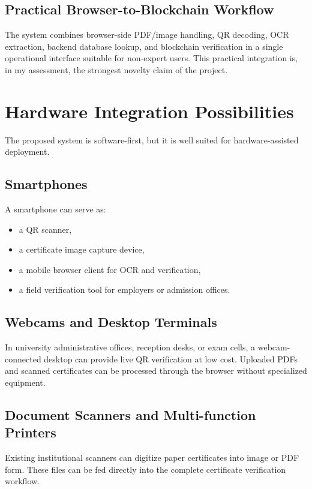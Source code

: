 \documentclass[12pt,a4paper]{article}
\begin{document}
\subsection{Practical Browser-to-Blockchain Workflow}
The system combines browser-side PDF/image handling, QR decoding, OCR extraction, backend database lookup, and blockchain verification in a single operational interface suitable for non-expert users. This practical integration is, in my assessment, the strongest novelty claim of the project.

\section{Hardware Integration Possibilities}
The proposed system is software-first, but it is well suited for hardware-assisted deployment.

\subsection{Smartphones}
A smartphone can serve as:
\begin{itemize}[leftmargin=1.5em]
\item a QR scanner,
\item a certificate image capture device,
\item a mobile browser client for OCR and verification,
\item a field verification tool for employers or admission offices.
\end{itemize}

\subsection{Webcams and Desktop Terminals}
In university administrative offices, reception desks, or exam cells, a webcam-connected desktop can provide live QR verification at low cost. Uploaded PDFs and scanned certificates can be processed through the browser without specialized equipment.

\subsection{Document Scanners and Multi-function Printers}
Existing institutional scanners can digitize paper certificates into image or PDF form. These files can be fed directly into the complete certificate verification workflow.
\end{document}

